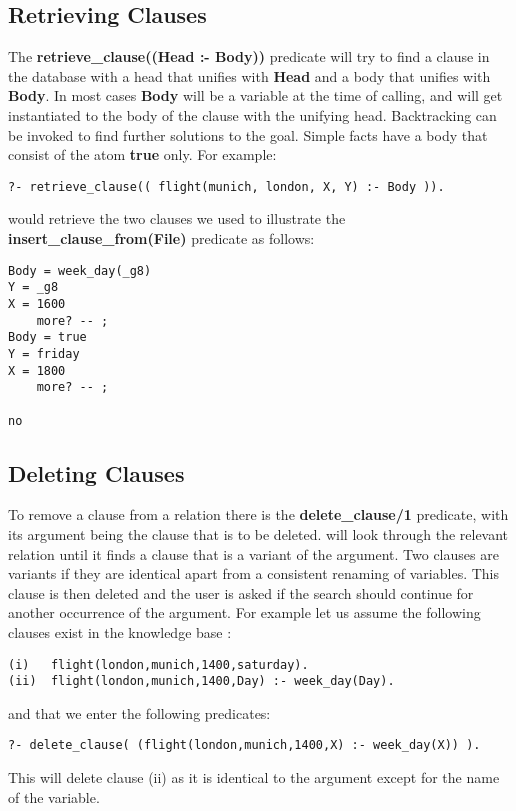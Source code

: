 \subsection{Retrieving Clauses}
The {\bf retrieve\_clause((Head :- Body))} predicate will try to find a
clause in the database with a head that unifies with {\bf Head} and
a body that unifies with {\bf Body}. In most cases {\bf Body} will
be a variable at the time of calling, and will get instantiated to 
the body of the clause with the unifying head.  Backtracking can be invoked 
to find further solutions to the goal. Simple facts have a body that
consist of the atom {\bf true} only.
For example:
\begin{verbatim}
?- retrieve_clause(( flight(munich, london, X, Y) :- Body )).
\end{verbatim}
would retrieve the two clauses we used to illustrate
the {\bf insert\_clause\_from(File)} predicate as follows:
\begin{verbatim}
Body = week_day(_g8)
Y = _g8
X = 1600
	more? -- ;
Body = true
Y = friday
X = 1800
	more? -- ;

no
\end{verbatim}

\subsection{Deleting Clauses}
 

To remove a clause from a relation there is the {\bf delete\_clause/1 }
predicate, with its argument being the clause that is to be deleted.
\eclipse will look through the relevant relation until it finds
a clause that is a variant of the argument. Two clauses are variants 
if they are identical apart from a consistent renaming of variables.
This clause is then deleted and the user is asked if the search should 
continue for another occurrence of the argument.
For example let us assume the following clauses exist in the knowledge
base :

\begin{verbatim}
(i)   flight(london,munich,1400,saturday).
(ii)  flight(london,munich,1400,Day) :- week_day(Day).
\end{verbatim}

and that we enter the following predicates:
\begin{verbatim}
?- delete_clause( (flight(london,munich,1400,X) :- week_day(X)) ).
\end{verbatim}
This will delete clause (ii) as it is identical to the argument except
for the name of the variable.
  
